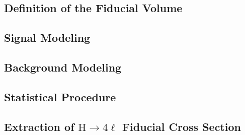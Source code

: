 \documentclass[
12pt, %
english, %
singlespacing, %
liststotoc, %
headsepline, %
]{MastersDoctoralThesis} %
\begin{document}
    \subsection{Definition of the Fiducial Volume}\label{sec:FiducialVolume}
      
    \subsection{Signal Modeling}\label{sec:SignalModeling}
     \subsection{Background Modeling}
      \label{sec:background_model}
      \subsection{Statistical Procedure}\label{sec:StatProcedure}      
            
    \subsection{Extraction of $\mathrm{H}\to4\ell$ Fiducial Cross Section}\label{sec:Extraction}  %
\end{document}
